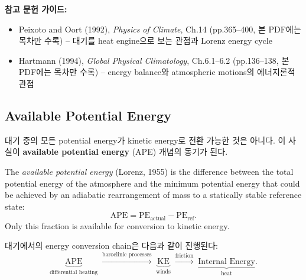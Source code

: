\begin{hisublock}
\textbf{참고 문헌 가이드:}
\begin{itemize}
  \item Peixoto and Oort (1992), \textit{Physics of Climate}, Ch.14 (pp.365--400, 본 PDF에는 목차만 수록) -- 대기를 heat engine으로 보는 관점과 Lorenz energy cycle
  \item Hartmann (1994), \textit{Global Physical Climatology}, Ch.6.1--6.2 (pp.136--138, 본 PDF에는 목차만 수록) -- energy balance와 atmospheric motions의 에너지론적 관점
\end{itemize}
\end{hisublock}

\subsection{Available Potential Energy}\label{subsec:ape}

대기 중의 모든 potential energy가 kinetic energy로 전환 가능한 것은 아니다.
이 사실이 \textbf{available potential energy} (APE) 개념의 동기가 된다.

\begin{definition}\label{def:ape}

  The \emph{available potential energy} (Lorenz, 1955) is the difference between the
  total potential energy of the atmosphere and the minimum potential energy that could
  be achieved by an adiabatic rearrangement of mass to a statically stable reference
  state:
  \begin{equation}\label{eq:ape}
    \mathrm{APE} = \mathrm{PE}_{\mathrm{actual}} - \mathrm{PE}_{\mathrm{ref}}.
  \end{equation}
  Only this fraction is available for conversion to kinetic energy.
\end{definition}

대기에서의 energy conversion chain은 다음과 같이 진행된다:
\begin{equation}\label{eq:energy-chain}
  \underbrace{\mathrm{APE}}_{\text{differential heating}}
  \;\xrightarrow{\text{baroclinic processes}}\;
  \underbrace{\mathrm{KE}}_{\text{winds}}
  \;\xrightarrow{\text{friction}}\;
  \underbrace{\text{Internal Energy}}_{\text{heat}}.
\end{equation}

